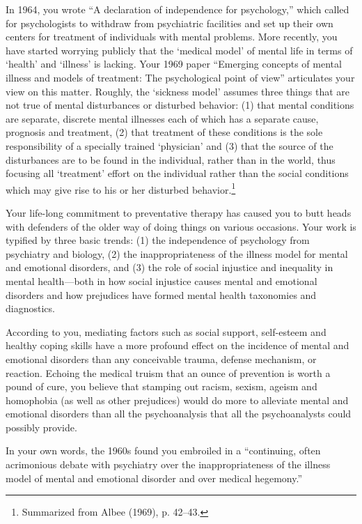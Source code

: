 \begin{refsection}
In 1964, you wrote ``A declaration of independence for psychology,'' which called for psychologists to withdraw from psychiatric facilities and set up their own centers for treatment of individuals with mental problems. More recently, you have started worrying publicly that the `medical model' of mental life in terms of `health' and `illness' is lacking. Your 1969 paper ``Emerging concepts of mental illness and models of treatment: The psychological point of view'' articulates your view on this matter. Roughly, the `sickness model' assumes three things that are not true of mental disturbances or disturbed behavior: (1) that mental conditions are separate, discrete mental illnesses each of which has a separate cause, prognosis and treatment, (2) that treatment of these conditions is the sole responsibility of a specially trained `physician' and (3) that the source of the disturbances are to be found in the individual, rather than in the world, thus focusing all `treatment' effort on the individual rather than the social conditions which may give rise to his or her disturbed behavior.\footnote{Summarized from Albee (1969), p. 42--43.}

Your life-long commitment to preventative therapy has caused you to butt heads with defenders of the older way of doing things on various occasions. Your work is typified by three basic trends: (1) the independence of psychology from psychiatry and biology, (2) the inappropriateness of the illness model for mental and emotional disorders, and (3) the role of social injustice and inequality in mental health---both in how social injustice causes mental and emotional disorders and how prejudices have formed mental health taxonomies and diagnostics.

According to you, mediating factors such as social support, self-esteem and healthy coping skills have a more profound effect on the incidence of mental and emotional disorders than any conceivable trauma, defense mechanism, or reaction. Echoing the medical truism that an ounce of prevention is worth a pound of cure, you believe that stamping out racism, sexism, ageism and homophobia (as well as other prejudices) would do more to alleviate mental and emotional disorders than all the psychoanalysis that all the psychoanalysts could possibly provide.

In your own words, the 1960s found you embroiled in a ``continuing, often acrimonious debate with psychiatry over the inappropriateness of the illness model of mental and emotional disorder and over medical hegemony.''


\end{refsection}
